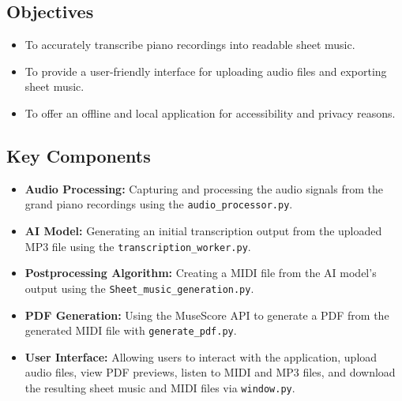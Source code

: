 \documentclass{article}
\begin{document}
\subsection{Objectives}
\begin{itemize}
    \item To accurately transcribe piano recordings into readable sheet music.
    \item To provide a user-friendly interface for uploading audio files and exporting sheet music.
    \item To offer an offline and local application for accessibility and privacy reasons.
\end{itemize}

\subsection{Key Components}
\begin{itemize}
    \item \textbf{Audio Processing:} Capturing and processing the audio signals from the grand piano recordings using the \texttt{audio\_processor.py}.
    \item \textbf{AI Model:} Generating an initial transcription output from the uploaded MP3 file using the \texttt{transcription\_worker.py}.
    \item \textbf{Postprocessing Algorithm:} Creating a MIDI file from the AI model's output using the \texttt{Sheet\_music\_generation.py}.
    \item \textbf{PDF Generation:} Using the MuseScore API to generate a PDF from the generated MIDI file with \texttt{generate\_pdf.py}.
    \item \textbf{User Interface:} Allowing users to interact with the application, upload audio files, view PDF previews, listen to MIDI and MP3 files, and download the resulting sheet music and MIDI files via \texttt{window.py}.
\end{itemize}

\FloatBarrier %
\end{document}
